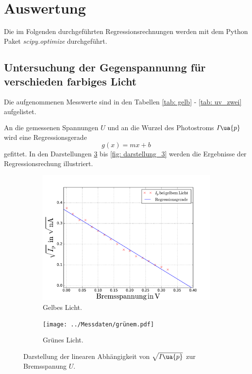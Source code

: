 \section{Auswertung}

Die im Folgenden durchgeführten Regressionsrechnungen werden mit dem
Python Paket \emph{scipy.optimize}\cite{scipy} durchgeführt. %

\subsection{Untersuchung der Gegenspannunng für verschieden farbiges Licht}
Die aufgenommenen Messwerte sind in den Tabellen \ref{tab: gelb} - \ref{tab: uv_zwei} aufgelistet.






An die gemessenen Spannungen $U$ und an die Wurzel des Photostroms $I\ua{p}$ wird eine
Regressionsgerade
\begin{equation}
  \label{eq:reg} %
  g(x)=mx+b
\end{equation}
gefittet.
In den Darstellungen \ref{fig: darstellung_1} bis \ref{fig: darstellung_3} werden die Ergebnisse der Regressionsrechung
illustriert.
\begin{figure}
  \centering
  \begin{subfigure}{0.48\textwidth}
    \centering
    \includegraphics[width=1 \textwidth]{../Messdaten/gelbem.pdf}
    \caption{Gelbes Licht.}
    \label{fig: gelb}
  \end{subfigure}
  \begin{subfigure}{0.48\textwidth}
    \centering
    \texttt{[image: ../Messdaten/grünem.pdf]}
    \caption{Grünes Licht.}
    \label{fig: grün}
  \end{subfigure}
  \caption{Darstellung der linearen Abhängigkeit von $\sqrt{I\ua{p}}$ zur Bremsspanung $U$.}
  \label{fig: darstellung_1}
\end{figure}
